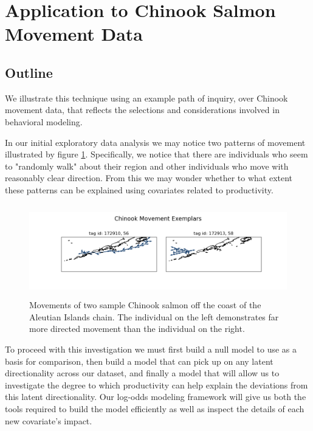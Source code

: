 \documentclass[11pt]{article}
\begin{document}
\section*{Application to Chinook Salmon Movement Data}

\subsection*{Outline}

We illustrate this technique using an example path of inquiry, over Chinook movement data, that reflects the selections and considerations involved in behavioral modeling.

In our initial exploratory data analysis we may notice two patterns of movement illustrated by figure \ref{fig:exemplars}. Specifically, we notice that there are individuals who seem to "randomly walk" about their region and other individuals who move with reasonably clear direction. From this we may wonder whether to what extent these patterns can be explained using covariates related to productivity. 

\begin{figure}[h!] 
	\centering
  \includegraphics[height=40mm]{figures/exemplars.png}
  \caption{Movements of two sample Chinook salmon off the coast of the Aleutian Islands chain. The individual on the left demonstrates far more directed movement than the individual on the right.}
  \label{fig:exemplars}
\end{figure}

\FloatBarrier

To proceed with this investigation we must first build a null model to use as a basis for comparison, then build a model that can pick up on any latent directionality across our dataset, and finally a model that will allow us to investigate the degree to which productivity can help explain the deviations from this latent directionality. Our log-odds modeling framework will give us both the tools required to build the model efficiently as well as inspect the details of each new covariate's impact.
\end{document}
